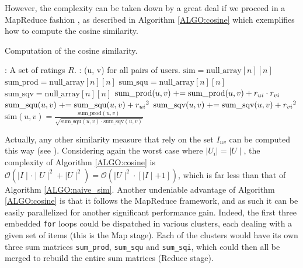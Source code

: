 However, the complexity can be taken down by a great deal if we proceed in a
MapReduce fashion \cite{DeaGhe04}, as described in Algorithm \ref{ALGO:cosine}
which exemplifies how to compute the cosine similarity.
\begin{algorithm}[!ht]
 \caption{Computation of the cosine similarity.}
       \label{ALGO:cosine}
       \begin{algorithmic}

         : A set of ratings $R$.
         : (u, v) for all pairs of users.
         \STATE $\text{sim} = \text{null\_array}[n][n]$
         \STATE $\text{sum\_prod} = \text{null\_array}[n][n]$
         \STATE $\text{sum\_squ} = \text{null\_array}[n][n]$
         \STATE $\text{sum\_sqv} = \text{null\_array}[n][n]$
              \STATE $\text{sum\_prod}(u, v) \mathrel{+}= \text{sum\_prod}(u, v) +
              r_{ui} \cdot r_{vi}$
              \STATE $\text{sum\_squ}(u, v) \mathrel{+}= \text{sum\_squ}(u, v) +
              {r_{ui}}^2$
              \STATE $\text{sum\_sqv}(u, v) \mathrel{+}= \text{sum\_sqv}(u, v) +
              {r_{vi}}^2$
             \ENDFOR
           \ENDFOR
         \ENDFOR
           \STATE $\text{sim}(u, v) = \frac{\text{sum\_prod}(u,
           v)}{\sqrt{\text{sum\_squ}(u, v) \cdot \text{sum\_sqv}(u, v)}}$
           \ENDFOR
         \ENDFOR
\end{algorithmic}
\end{algorithm}
Actually, any other similarity measure that rely on the set $I_{uv}$ can be
computed this way (see \cite{SchBodVolRECSYS12}). Considering again the worst
case where $\mid U_i \mid = \mid U \mid$, the complexity of Algorithm
\ref{ALGO:cosine} is  $\mathcal{O}(\mid I \mid \cdot \mid U \mid^2 + \mid
U \mid^2) = \mathcal{O}( \mid U \mid^2 \cdot [ \mid I \mid + 1])$, which is far
less than that of Algorithm \ref{ALGO:naive_sim}. Another undeniable advantage
of Algorithm  \ref{ALGO:cosine} is that it follows the MapReduce framework, and
as such it can be easily parallelized for another significant performance gain.
Indeed, the first three embedded \texttt{for} loops could be dispatched in various
clusters, each dealing with a given set of items (this is the Map stage). Each
of the clusters would have its own three sum matrices \texttt{sum\_prod},
\texttt{sum\_squ} and \texttt{sum\_sqi}, which could then all be merged to
rebuild the entire sum matrices (Reduce stage).

